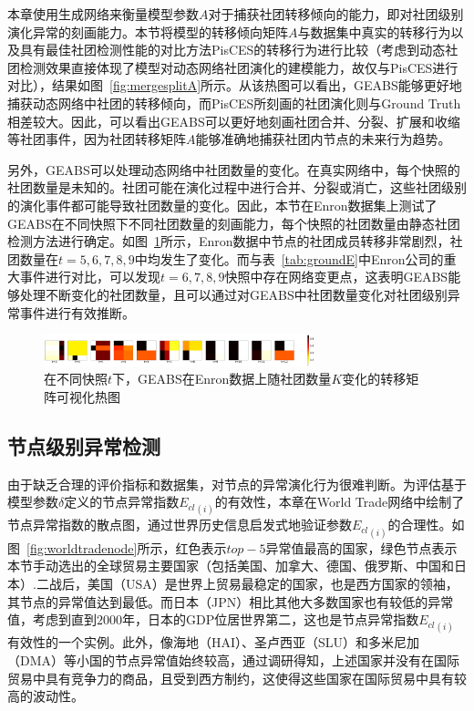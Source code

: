 本章使用生成网络来衡量模型参数$A$对于捕获社团转移倾向的能力，即对社团级别演化异常的刻画能力。本节将模型的转移倾向矩阵$A$与数据集中真实的转移行为以及具有最佳社团检测性能的对比方法PisCES的转移行为进行比较（考虑到动态社团检测效果直接体现了模型对动态网络社团演化的建模能力，故仅与PisCES进行对比），结果如图~\ref{fig:mergesplitA}所示。从该热图可以看出，GEABS能够更好地捕获动态网络中社团的转移倾向，而PisCES所刻画的社团演化则与Ground Truth相差较大。因此，可以看出GEABS可以更好地刻画社团合并、分裂、扩展和收缩等社团事件，因为社团转移矩阵$A$能够准确地捕获社团内节点的未来行为趋势。




另外，GEABS可以处理动态网络中社团数量的变化。在真实网络中，每个快照的社团数量是未知的。社团可能在演化过程中进行合并、分裂或消亡，这些社团级别的演化事件都可能导致社团数量的变化。因此，本节在Enron数据集上测试了GEABS在不同快照下不同社团数量的刻画能力，每个快照的社团数量由静态社团检测方法进行确定。如图~\ref{fig:enronTransA}所示，Enron数据中节点的社团成员转移非常剧烈，社团数量在$t=5,6,7,8,9$中均发生了变化。而与表~\ref{tab:groundE}中Enron公司的重大事件进行对比，可以发现$t=6,7,8,9$快照中存在网络变更点，这表明GEABS能够处理不断变化的社团数量，且可以通过对GEABS中社团数量变化对社团级别异常事件进行有效推断。
 
 \begin{figure}
 	\centering
 	\includegraphics[width=0.7\textwidth]{figures/chap05/EnronTransA-heatmap.pdf}
 	\caption{在不同快照$t$下，GEABS在Enron数据上随社团数量$K$变化的转移矩阵可视化热图}
 	\label{fig:enronTransA}
 \end{figure}
 
 
\subsection{节点级别异常检测}


由于缺乏合理的评价指标和数据集，对节点的异常演化行为很难判断。为评估基于模型参数$\delta$定义的节点异常指数${E_{cl}}_{(i)}$的有效性，本章在World Trade网络中绘制了节点异常指数的散点图，通过世界历史信息启发式地验证参数${E_{cl}}_{(i)}$的合理性。如图~\ref{fig:worldtradenode}所示，红色表示$top-5$异常值最高的国家，绿色节点表示本节手动选出的全球贸易主要国家（包括美国、加拿大、德国、俄罗斯、中国和日本）.二战后，美国（USA）是世界上贸易最稳定的国家，也是西方国家的领袖，其节点的异常值达到最低。而日本（JPN）相比其他大多数国家也有较低的异常值，考虑到直到$2000$年，日本的GDP位居世界第二，这也是节点异常指数${E_{cl}}_{(i)}$有效性的一个实例。此外，像海地（HAI）、圣卢西亚（SLU）和多米尼加（DMA）等小国的节点异常值始终较高，通过调研得知，上述国家并没有在国际贸易中具有竞争力的商品，且受到西方制约，这使得这些国家在国际贸易中具有较高的波动性。


